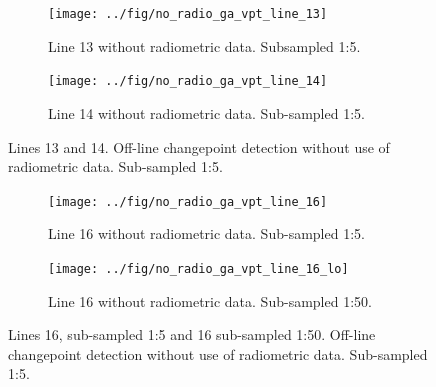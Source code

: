 \begin{figure}
	\centering
	\begin{subfigure}[b]{1\textwidth}
		\centering
		\texttt{[image: ../fig/no\_radio\_ga\_vpt\_line\_13]}
		\caption[Line 13, no radometry]{Line 13 without radiometric data. Subsampled 1:5. }
	\label{fig:galine13_no}
\end{subfigure}

\begin{subfigure}[b]{1\textwidth}
	\centering
	\texttt{[image: ../fig/no\_radio\_ga\_vpt\_line\_14]}
	\caption[Line 14, without radiometry]{Line 14 without radiometric data. Sub-sampled 1:5. }
\label{fig:galine14_no}
\end{subfigure}

\caption[Line 13 and 14 without radiometry]{Lines 13 and 14. Off-line changepoint detection without use of radiometric data. Sub-sampled 1:5.}
\end{figure}

\begin{figure}
	\centering
	\begin{subfigure}[b]{1\textwidth}
		\centering
		\texttt{[image: ../fig/no\_radio\_ga\_vpt\_line\_16]}
		\caption[Line 16, no radiometry]{Line 16 without radiometric data. Sub-sampled 1:5.} 
		\label{fig:galine16_no}
	\end{subfigure}
	
	\begin{subfigure}[b]{1\textwidth}
		\centering
		\texttt{[image: ../fig/no\_radio\_ga\_vpt\_line\_16\_lo]}
		\caption[Line 16, no radiometry, subsampled 50]{Line 16 without radiometric data. Sub-sampled 1:50.}
		\label{fig:galine16_no_lo}
	\end{subfigure}
	
	
	\caption[Line 16 without radiometry. Sub-sampled 1:5 and 1:50.]{Lines 16, sub-sampled 1:5 and 16 sub-sampled 1:50. Off-line changepoint detection without use of radiometric data. Sub-sampled 1:5. }
\end{figure}

